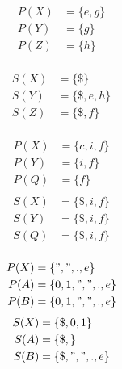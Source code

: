 \documentclass[nochap]{apuntes}
\begin{document}
\begin{problem}[6]

\solution
\begin{minipage}{0.3\textwidth}
\ppart
\begin{align*}
P(X)&=\{e,g\}\\
P(Y)&=\{g\}\\
P(Z)&=\{h\}\\
\end{align*}

\begin{align*}
S(X)&=\{\$\}\\
S(Y)&=\{\$,e,h\}\\
S(Z)&=\{\$,f\}\\
\end{align*}
\end{minipage}

\begin{minipage}{0.3\textwidth}
\ppart
\begin{align*}
P(X)&=\{c,i,f\}\\
P(Y)&=\{i,f\}\\
P(Q)&=\{f\}\\
\end{align*}
\begin{align*}
S(X)&=\{\$,i,f\}\\
S(Y)&=\{\$,i,f\}\\
S(Q)&=\{\$,i,f\}\\
\end{align*}
\end{minipage}

\begin{minipage}{0.3\textwidth}
\ppart

\begin{align*}
P(X)&=\{",",.,e\}\\
P(A)&=\{0,1,",",.,e\}\\
P(B)&=\{0,1,",",.,e\}\\
\end{align*}
\begin{align*}
S(X)&=\{\$,0,1\}\\
S(A)&=\{\$,\}\\
S(B)&=\{\$,",",.,e\}\\
\end{align*}
\end{minipage}

\end{problem}
\end{document}
